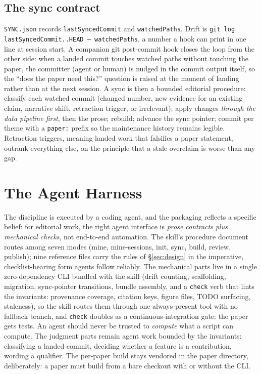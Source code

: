 \documentclass{article}
\begin{document}
\subsection{The sync contract}
\label{sec:sync}
\texttt{SYNC.json} records \texttt{lastSyncedCommit} and \texttt{watchedPaths}. Drift
is \texttt{git log lastSyncedCommit..HEAD -- watchedPaths}, a number a hook can print
in one line at session start. A companion git post-commit hook closes the loop from
the other side: when a landed commit touches watched paths without touching the
paper, the committer (agent or human) is nudged in the commit output itself, so the
``does the paper need this?'' question is raised at the moment of landing rather
than at the next session. A sync is then a bounded editorial procedure: classify
each watched commit (changed number, new evidence for an existing claim, narrative
shift, retraction trigger, or irrelevant); apply changes \emph{through the data
pipeline first}, then the prose; rebuild; advance the sync pointer; commit per theme
with a \texttt{paper:} prefix so the maintenance history remains legible. Retraction
triggers, meaning landed work that falsifies a paper statement, outrank everything
else, on the principle that a stale overclaim is worse than any gap.

\section{The Agent Harness}
\label{sec:harness}

The discipline is executed by a coding agent, and the packaging reflects a specific
belief: for editorial work, the right agent interface is \emph{prose contracts plus
mechanical checks}, not end-to-end automation. The skill's procedure document routes
among seven modes (mine, mine-sessions, init, sync, build, review, publish); nine
reference files carry the rules of \S\ref{sec:design} in the imperative,
checklist-bearing form agents follow reliably. The mechanical parts live in a single zero-dependency CLI
bundled with the skill (drift counting, scaffolding, migration, sync-pointer
transitions, bundle assembly, and a \texttt{check} verb that lints the invariants:
provenance coverage, citation keys, figure files, TODO surfacing, staleness), so
the skill routes them through one always-present tool with no fallback branch, and
\texttt{check} doubles as a continuous-integration gate: the paper gets tests. An
agent should never be trusted to \emph{compute} what a script can compute. The
judgment parts remain agent work bounded by the invariants: classifying a landed
commit, deciding whether a feature is a contribution, wording a qualifier. The
per-paper build stays vendored in the paper directory, deliberately: a paper must
build from a bare checkout with or without the CLI.
\end{document}
